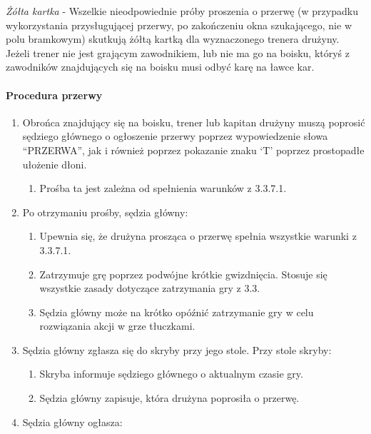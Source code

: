 \documentclass[12pt]{article}
\begin{document}
\emph{Żółta kartka} - Wszelkie nieodpowiednie próby proszenia o przerwę
(w przypadku wykorzystania przysługującej przerwy, po zakończeniu okna
szukającego, nie w polu bramkowym) skutkują żółtą kartką dla
wyznaczonego trenera drużyny. Jeżeli trener nie jest grającym
zawodnikiem, lub nie ma go na boisku, któryś z zawodników znajdujących
się na boisku musi odbyć karę na ławce kar.

\paragraph{Procedura przerwy}

\begin{enumerate}
	\item
	      Obrońca znajdujący się na boisku, trener lub kapitan drużyny muszą
	      poprosić sędziego głównego o ogłoszenie przerwy poprzez wypowiedzenie
	      słowa ``PRZERWA'', jak i również poprzez pokazanie znaku `T' poprzez
	      prostopadłe ułożenie dłoni.

	      \begin{enumerate}
		      \item
		            Prośba ta jest zależna od spełnienia warunków z 3.3.7.1.
	      \end{enumerate}
	\item
	      Po otrzymaniu prośby, sędzia główny:

	      \begin{enumerate}
		      \item
		            Upewnia się, że drużyna prosząca o przerwę spełnia wszystkie warunki
		            z 3.3.7.1.
		      \item
		            Zatrzymuje grę poprzez podwójne krótkie gwizdnięcia. Stosuje się
		            wszystkie zasady dotyczące zatrzymania gry z 3.3.
		      \item
		            Sędzia główny może na krótko opóźnić zatrzymanie gry w celu
		            rozwiązania akcji w grze tłuczkami.
	      \end{enumerate}
	\item
	      Sędzia główny zgłasza się do skryby przy jego stole. Przy stole
	      skryby:

	      \begin{enumerate}
		      \item
		            Skryba informuje sędziego głównego o aktualnym czasie gry.
		      \item
		            Sędzia główny zapisuje, która drużyna poprosiła o przerwę.
	      \end{enumerate}
	\item
	      Sędzia główny ogłasza:


\end{enumerate}
\end{document}
